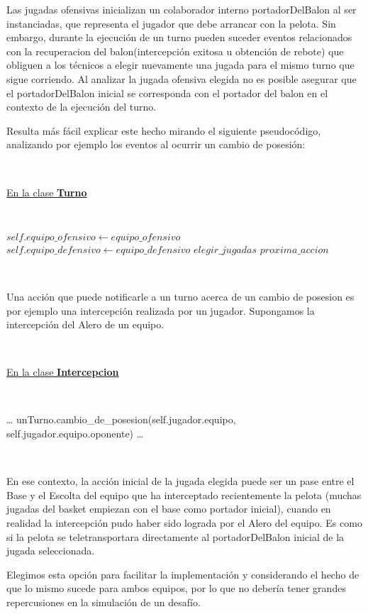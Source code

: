 Las jugadas ofensivas inicializan un colaborador interno portadorDelBalon al ser instanciadas, que representa el jugador que debe arrancar con la pelota.
Sin embargo, durante la ejecución de un turno pueden suceder eventos relacionados con la recuperacion del balon(intercepción exitosa u obtención de rebote)
que obliguen a los técnicos a elegir nuevamente una jugada para el mismo turno que sigue corriendo. Al analizar la jugada ofensiva
elegida no es posible asegurar que el portadorDelBalon inicial se corresponda con el portador del balon en el contexto de la ejecución del turno. 

Resulta más fácil explicar este hecho mirando el siguiente pseudocódigo, analizando por ejemplo los eventos al ocurrir un cambio de posesión:

~

\underline{En la clase \textbf{Turno}}

~

\begin{algorithmic}
	  \State $self.equipo\_ofensivo\gets equipo\_ofensivo$
	  \State $self.equipo\_defensivo\gets equipo\_defensivo$
	  \State $elegir\_jugadas$
	  \State $proxima\_accion$
	\EndFunction
\end{algorithmic}

~ 

Una acción que puede notificarle a un turno acerca de un cambio de posesion es por ejemplo una intercepción realizada por un jugador. Supongamos la intercepción del Alero de un equipo.

~

\underline{En la clase \textbf{Intercepcion}}

~

\begin{algorithmic}
	  \State \ldots
	  \State unTurno.cambio\_de\_posesion(self.jugador.equipo, self.jugador.equipo.oponente)
	  \State \ldots
	\EndFunction
\end{algorithmic}

~

En ese contexto, la acción inicial de la jugada elegida puede ser un pase entre el Base y el Escolta del equipo que ha interceptado recientemente la pelota (muchas jugadas
del basket empiezan con el base como portador inicial), cuando en realidad la intercepción pudo haber sido lograda por el Alero del equipo. Es como si la pelota se teletransportara
directamente al portadorDelBalon inicial de la jugada seleccionada.

Elegimos esta opción para facilitar la implementación y considerando el hecho de que lo mismo sucede para ambos equipos, por lo que no debería tener grandes repercusiones en la 
simulación de un desafío.

